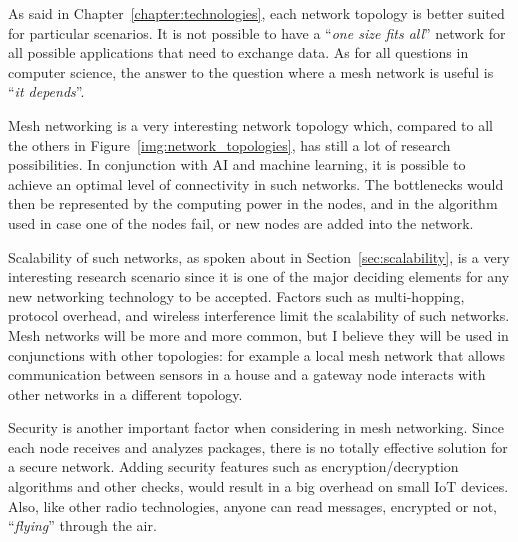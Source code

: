 			As said in Chapter~\ref{chapter:technologies}, each network topology is better suited for particular scenarios.
			It is not possible to have a ``\textit{one size fits all}'' network for all possible applications that need to exchange data.
			As for all questions in computer science, the answer to the question where a mesh network is useful is ``\textit{it depends}''.
			
			Mesh networking is a very interesting network topology which, compared to all the others in Figure~\ref{img:network_topologies}, has still a lot of research possibilities.
			In conjunction with AI and machine learning, it is possible to achieve an optimal level of connectivity in such networks.
			The bottlenecks would then be represented by the computing power in the nodes, and in the algorithm used in case one of the nodes fail, or new nodes are added into the network.

			Scalability of such networks, as spoken about in Section~\ref{sec:scalability}, is a very interesting research scenario since it is one of the major deciding elements for any new networking technology to be accepted.
			Factors such as multi-hopping, protocol overhead, and wireless interference limit the scalability of such networks.
			Mesh networks will be more and more common, but I believe they will be used in conjunctions with other topologies: for example a local mesh network that allows communication between sensors in a house and a gateway node interacts with other networks in a different topology.
			
			Security is another important factor when considering in mesh networking.
			Since each node receives and analyzes packages, there is no totally effective solution for a secure network.
			Adding security features such as encryption/decryption algorithms and other checks, would result in a big overhead on small IoT devices.
			Also, like other radio technologies, anyone can read messages, encrypted or not, ``\textit{flying}'' through the air.